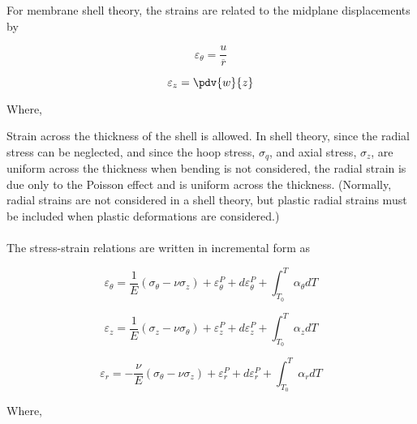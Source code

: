 For membrane shell theory, the strains are related to the midplane displacements by

\begin{equation}
    \label{eq:membrane_shell_theory_hoop}
    \varepsilon_{\theta} = \frac{u}{\overline{r}}
\end{equation}

\begin{equation}
    \label{eq:membrane_shell_theory_axial}
    \varepsilon_{z} = \pdv{w}{z}
\end{equation}

Where,

Strain across the thickness of the shell is allowed. In shell theory, since the radial stress can be
neglected, and since the hoop stress, $\sigma_{q}$, and axial stress, $\sigma_{z}$, are uniform
across the thickness when bending is not considered, the radial strain is due only to the Poisson
effect and is uniform across the thickness. (Normally, radial strains are not considered in a shell
theory, but plastic radial strains must be included when plastic deformations are considered.)
\\
\\
The stress-strain relations are written in incremental form as

\begin{equation}
    \label{eq:strain_relationship_hoop}
    \varepsilon_{\theta} = \frac{1}{E} \left(\sigma_{\theta} - \nu \sigma_{z}\right) + \varepsilon^{P}_{\theta} + d\varepsilon^{P}_{\theta} + \int_{T_{0}}^{T} \alpha_{\theta}dT
\end{equation}

\begin{equation}
    \label{eq:strain_relationship_axial}
    \varepsilon_{z} = \frac{1}{E} \left(\sigma_{z} - \nu \sigma_{\theta}\right) + \varepsilon^{P}_{z} + d\varepsilon^{P}_{z} + \int_{T_{0}}^{T} \alpha_{z}dT
\end{equation}

\begin{equation}
    \label{eq:strain_relationship_radial}
    \varepsilon_{r} = - \frac{\nu}{E} \left(\sigma_{\theta} - \nu \sigma_{z}\right) + \varepsilon^{P}_{r} + d\varepsilon^{P}_{r} + \int_{T_{0}}^{T} \alpha_{r}dT
\end{equation}

Where,

